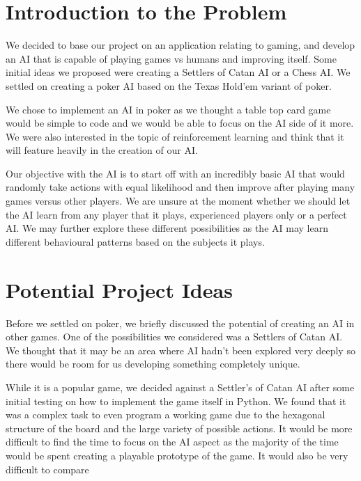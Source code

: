 \documentclass{article}
\begin{document}
\begin{multicols*}{2}
\section{Introduction to the Problem}
We decided to base our project on an application relating to gaming, and develop an AI that is capable of playing games vs humans and improving itself. Some initial ideas we proposed were creating a Settlers of Catan AI or a Chess AI. We settled on creating a poker AI based on the Texas Hold'em variant of poker.
\newline

We chose to implement an AI in poker as we thought a table top card game would be simple to code and we would be able to focus on the AI side of it more. We were also interested in the topic of reinforcement learning and think that it will feature heavily in the creation of our AI.

Our objective with the AI is to start off with an incredibly basic AI that would randomly take actions with equal likelihood and then improve after playing many games versus other players. We are unsure at the moment whether we should let the AI learn from any player that it plays, experienced players only or a perfect AI. We may further explore these different possibilities as the AI may learn different behavioural patterns based on the subjects it plays.


\section{Potential Project Ideas}
Before we settled on poker, we briefly discussed the potential of creating an AI in other games. One of the possibilities we considered was a Settlers of Catan AI. We thought that it may be an area where AI hadn't been explored very deeply so there would be room for us developing something completely unique.
\newline

While it is a popular game, we decided against a Settler's of Catan AI after some initial testing on how to implement the game itself in Python. We found that it was a complex task to even program a working game due to the hexagonal structure of the board and the large variety of possible actions. It would be more difficult to find the time to focus on the AI aspect as the majority of the time would be spent creating a playable prototype of the game. It would also be very difficult to compare
\newline


\end{multicols*}
\end{document}
